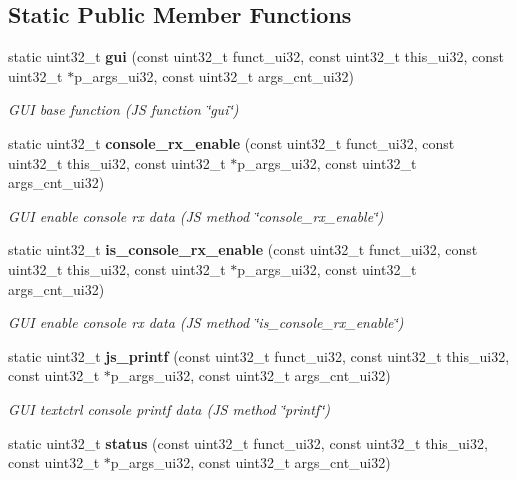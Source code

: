 \subsection*{Static Public Member Functions}
\begin{DoxyCompactItemize}
\item 
static uint32\+\_\+t \textbf{ gui} (const uint32\+\_\+t funct\+\_\+ui32, const uint32\+\_\+t this\+\_\+ui32, const uint32\+\_\+t $\ast$p\+\_\+args\+\_\+ui32, const uint32\+\_\+t args\+\_\+cnt\+\_\+ui32)
\begin{DoxyCompactList}\small\item\em G\+UI base function (JS function \char`\"{}gui\char`\"{}) \end{DoxyCompactList}\item 
static uint32\+\_\+t \textbf{ console\+\_\+rx\+\_\+enable} (const uint32\+\_\+t funct\+\_\+ui32, const uint32\+\_\+t this\+\_\+ui32, const uint32\+\_\+t $\ast$p\+\_\+args\+\_\+ui32, const uint32\+\_\+t args\+\_\+cnt\+\_\+ui32)
\begin{DoxyCompactList}\small\item\em G\+UI enable console rx data (JS method \char`\"{}console\+\_\+rx\+\_\+enable\char`\"{}) \end{DoxyCompactList}\item 
static uint32\+\_\+t \textbf{ is\+\_\+console\+\_\+rx\+\_\+enable} (const uint32\+\_\+t funct\+\_\+ui32, const uint32\+\_\+t this\+\_\+ui32, const uint32\+\_\+t $\ast$p\+\_\+args\+\_\+ui32, const uint32\+\_\+t args\+\_\+cnt\+\_\+ui32)
\begin{DoxyCompactList}\small\item\em G\+UI enable console rx data (JS method \char`\"{}is\+\_\+console\+\_\+rx\+\_\+enable\char`\"{}) \end{DoxyCompactList}\item 
static uint32\+\_\+t \textbf{ js\+\_\+printf} (const uint32\+\_\+t funct\+\_\+ui32, const uint32\+\_\+t this\+\_\+ui32, const uint32\+\_\+t $\ast$p\+\_\+args\+\_\+ui32, const uint32\+\_\+t args\+\_\+cnt\+\_\+ui32)
\begin{DoxyCompactList}\small\item\em G\+UI textctrl console printf data (JS method \char`\"{}printf\char`\"{}) \end{DoxyCompactList}\item 
static uint32\+\_\+t \textbf{ status} (const uint32\+\_\+t funct\+\_\+ui32, const uint32\+\_\+t this\+\_\+ui32, const uint32\+\_\+t $\ast$p\+\_\+args\+\_\+ui32, const uint32\+\_\+t args\+\_\+cnt\+\_\+ui32)

\end{DoxyCompactItemize}
